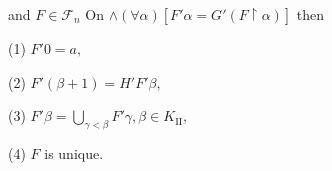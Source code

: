 and $F \in \mathcal{F}_n$ On $\land (\forall \alpha)[F'\alpha = G'(F \upharpoonright \alpha)]$ then

(1) $F'0 = a,$

(2) $F'(\beta + 1) = H'F'\beta,$

(3) $F'\beta = \bigcup_{\gamma < \beta} F'\gamma, \beta \in K_{\text{II}},$

(4) $F$ is unique.
